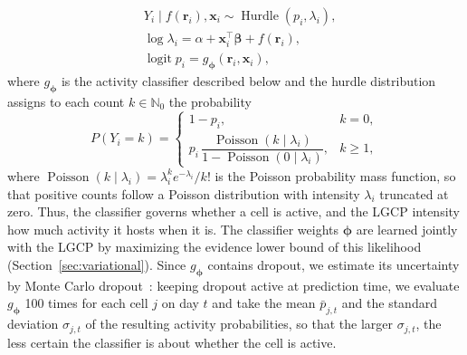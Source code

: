 \begin{equation}
    \begin{aligned}
        &Y_i \mid f(\mathbf{r}_i),\mathbf{x}_i
        \sim \operatorname{Hurdle}(p_i,\lambda_i),\\
        &\log \lambda_i
        = \alpha+\mathbf{x}_i^\top\boldsymbol{\beta}
        +f(\mathbf{r}_i),\\
        &\operatorname{logit} p_i
        = g_{\boldsymbol{\phi}}(\mathbf{r}_i,\mathbf{x}_i),
    \end{aligned}
    \label{eq:model}
\end{equation}
where $g_{\boldsymbol{\phi}}$ is the activity classifier described below and the hurdle distribution~\citep{mullahy1986specification} assigns to each count $k\in\mathbb{N}_0$ the probability
\begin{equation}
    P(Y_i=k)=
    \begin{cases}
        1-p_i, & k=0,\\[2pt]
        p_i\,\dfrac{\operatorname{Poisson}(k\mid\lambda_i)}{1-\operatorname{Poisson}(0\mid\lambda_i)}, & k\geq1,
    \end{cases}
    \label{eq:hurdle}
\end{equation}
where $\operatorname{Poisson}(k\mid\lambda_i)=\lambda_i^{k}e^{-\lambda_i}/k!$ is the Poisson probability mass function, so that positive counts follow a Poisson distribution with intensity $\lambda_i$ truncated at zero. Thus, the classifier governs whether a cell is active, and the LGCP intensity how much activity it hosts when it is. The classifier weights $\boldsymbol{\phi}$ are learned jointly with the LGCP by maximizing the evidence lower bound of this likelihood (Section~\ref{sec:variational}). Since $g_{\boldsymbol{\phi}}$ contains dropout, we estimate its uncertainty by Monte Carlo dropout~\citep{gal2016dropout}: keeping dropout active at prediction time, we evaluate $g_{\boldsymbol{\phi}}$ 100 times for each cell $j$ on day $t$ and take the mean $\bar p_{j,t}$ and the standard deviation $\sigma_{j,t}$ of the resulting activity probabilities, so that the larger $\sigma_{j,t}$, the less certain the classifier is about whether the cell is active.

